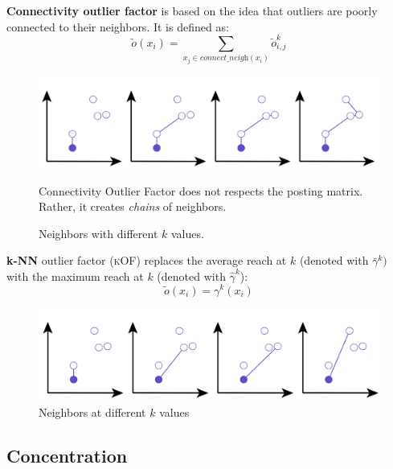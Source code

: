 \begin{paracol}{2}
   \colfill
   \textbf{Connectivity outlier factor} is based on the idea that outliers are poorly connected to their neighbors. It is defined as:
   \[
		\tilde{o}(x_i) = \sum_{x_j \in \textit{connect\_neigh}(x_i)} \tilde{o}^k_{i,j}
      \]
      \colfill
   \switchcolumn

   \begin{figure}[htbp]
      \centering
      \includegraphics[width=0.95\columnwidth]{images/06/cof.png}
      \caption{Neighbors with different $k$ values.}
      Connectivity Outlier Factor does not respects the posting matrix. Rather, it creates \textit{chains} of neighbors.
      \label{fig:06/cof}
   \end{figure}
\end{paracol}

\begin{paracol}{2}
   \colfill
   \textbf{k-NN} outlier factor (\textsc{kOF}) replaces the average reach at $k$ (denoted with $\bar{\gamma}^k)$ with the maximum reach at $k$ (denoted with $\hat{\gamma}^k$):
   \[
   \tilde{o}(x_i) = \gamma^k(x_i)
   \]
   \colfill
   \switchcolumn

   \begin{figure}[htbp]
      \centering
      \includegraphics[width=0.95\columnwidth]{images/06/kof.png}
      \caption{Neighbors at different $k$ values}
      \label{fig:06/kof}
   \end{figure}
\end{paracol}

\newpage
\subsection{Concentration}

